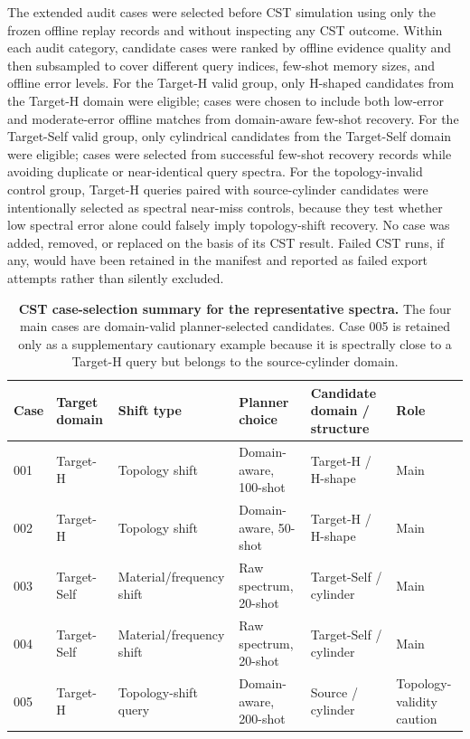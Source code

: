 \documentclass[final,1p,times]{elsarticle}
\begin{document}
The extended audit cases were selected before CST simulation using only the frozen offline replay records and without inspecting any CST outcome. Within each audit category, candidate cases were ranked by offline evidence quality and then subsampled to cover different query indices, few-shot memory sizes, and offline error levels. For the Target-H valid group, only H-shaped candidates from the Target-H domain were eligible; cases were chosen to include both low-error and moderate-error offline matches from domain-aware few-shot recovery. For the Target-Self valid group, only cylindrical candidates from the Target-Self domain were eligible; cases were selected from successful few-shot recovery records while avoiding duplicate or near-identical query spectra. For the topology-invalid control group, Target-H queries paired with source-cylinder candidates were intentionally selected as spectral near-miss controls, because they test whether low spectral error alone could falsely imply topology-shift recovery. No case was added, removed, or replaced on the basis of its CST result. Failed CST runs, if any, would have been retained in the manifest and reported as failed export attempts rather than silently excluded.

\begin{table}[htbp!]
\centering
\caption{\textbf{CST case-selection summary for the representative spectra.}
The four main cases are domain-valid planner-selected candidates. Case 005 is retained only as a supplementary cautionary example because it is spectrally close to a Target-H query but belongs to the source-cylinder domain.}
\label{tab:si_phase5_cst_cases}
\footnotesize
\setlength{\tabcolsep}{3.8pt}
\renewcommand{\arraystretch}{1.12}
\begin{tabular}{llllll}
\toprule
Case & Target domain & Shift type & Planner choice & Candidate domain / structure & Role \\
\midrule
001 & Target-H & Topology shift & Domain-aware, 100-shot & Target-H / H-shape & Main \\
002 & Target-H & Topology shift & Domain-aware, 50-shot & Target-H / H-shape & Main \\
003 & Target-Self & Material/frequency shift & Raw spectrum, 20-shot & Target-Self / cylinder & Main \\
004 & Target-Self & Material/frequency shift & Raw spectrum, 20-shot & Target-Self / cylinder & Main \\
005 & Target-H & Topology-shift query & Domain-aware, 200-shot & Source / cylinder & Topology-validity caution \\
\bottomrule
\end{tabular}
\end{table}
\end{document}
